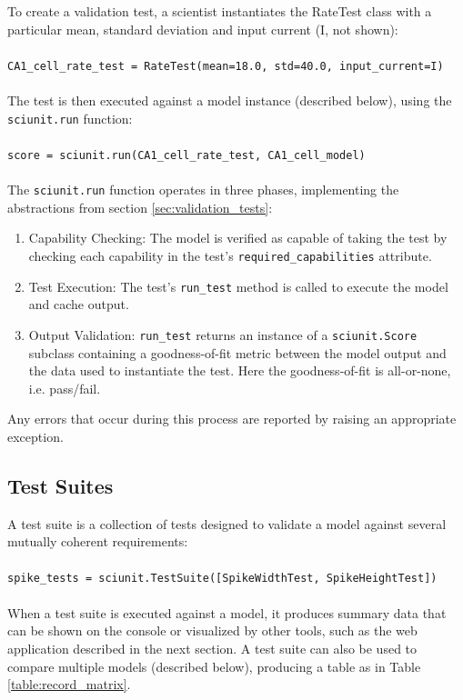 \documentclass[11pt,letterpaper]{article}
\begin{document}
To create a validation test, a scientist instantiates the RateTest class with a particular mean, standard deviation and input current (I, not shown):\\
\vspace{-7px}\\\verb|CA1_cell_rate_test = RateTest(mean=18.0, std=40.0, input_current=I)|\\\vspace{-7px}
\\
The test is then executed against a model instance (described below), using the \verb|sciunit.run| function:\\
\vspace{-7px}\\\verb|score = sciunit.run(CA1_cell_rate_test, CA1_cell_model)|\\\vspace{-7px}
\\
The \verb|sciunit.run| function operates in three phases, implementing the abstractions from section \ref{sec:validation_tests}:
\begin{enumerate}
\item Capability Checking: The model is verified as capable of taking the test by checking each capability in the test's \verb|required_capabilities| attribute.
\item Test Execution: The test's \verb|run_test| method is called to execute the model and cache output.
\item Output Validation: \verb|run_test| returns an instance of a \verb|sciunit.Score| subclass containing a goodness-of-fit metric between the model output and the data used to instantiate the test.  Here the goodness-of-fit is all-or-none, i.e. pass/fail.  
\end{enumerate}
\hspace{-0px}Any errors that occur during this process are reported by raising an appropriate exception.

\subsection{Test Suites}
A test suite is a collection of tests designed to validate a model against several mutually coherent requirements:\\
\vspace{-7px}\\\verb|spike_tests = sciunit.TestSuite([SpikeWidthTest, SpikeHeightTest])|\\\vspace{-7px}
\\
When a test suite is executed against a model, it produces summary data that can be shown on the console or visualized by other tools, such as the web application described in the next section. A test suite can also be used to compare multiple models (described below), producing a table as in Table \ref{table:record_matrix}.
\end{document}
